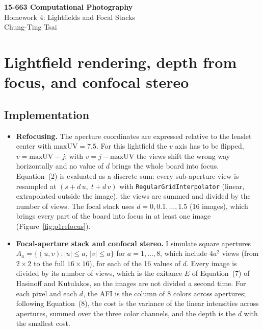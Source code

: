 \documentclass[11pt]{article}
\begin{document}
\begin{center}
{\Large\bfseries 15-663 Computational Photography}\\[4pt]
{\large Homework 4: Lightfields and Focal Stacks}\\[4pt]
Chung-Ting Tsai
\end{center}

\section{Lightfield rendering, depth from focus, and confocal stereo}
\subsection*{Implementation}
\begin{itemize}\setlength{\itemsep}{2pt}
\item \textbf{Refocusing.} The aperture coordinates are expressed relative to the lenslet center with $\mathrm{maxUV}=7.5$. For this lightfield the $v$ axis has to be flipped, $v=\mathrm{maxUV}-j$; with $v=j-\mathrm{maxUV}$ the views shift the wrong way horizontally and no value of $d$ brings the whole board into focus. Equation~(2) is evaluated as a discrete sum: every sub-aperture view is resampled at $(s+d\,u,\;t+d\,v)$ with \texttt{RegularGridInterpolator} (linear, extrapolated outside the image), the views are summed and divided by the number of views. The focal stack uses $d=0,0.1,\dots,1.5$ (16 images), which brings every part of the board into focus in at least one image (Figure~\ref{fig:p1refocus}).
\item \textbf{Focal-aperture stack and confocal stereo.} I simulate square apertures $A_a=\{(u,v):|u|\le a,\,|v|\le a\}$ for $a=1,\dots,8$, which include $4a^2$ views (from $2\times2$ to the full $16\times16$), for each of the 16 values of $d$. Every image is divided by its number of views, which is the exitance $E$ of Equation~(7) of Hasinoff and Kutulakos, so the images are not divided a second time. For each pixel and each $d$, the AFI is the column of 8 colors across apertures; following Equation~(8), the cost is the variance of the linear intensities across apertures, summed over the three color channels, and the depth is the $d$ with the smallest cost.
\end{itemize}
\end{document}
